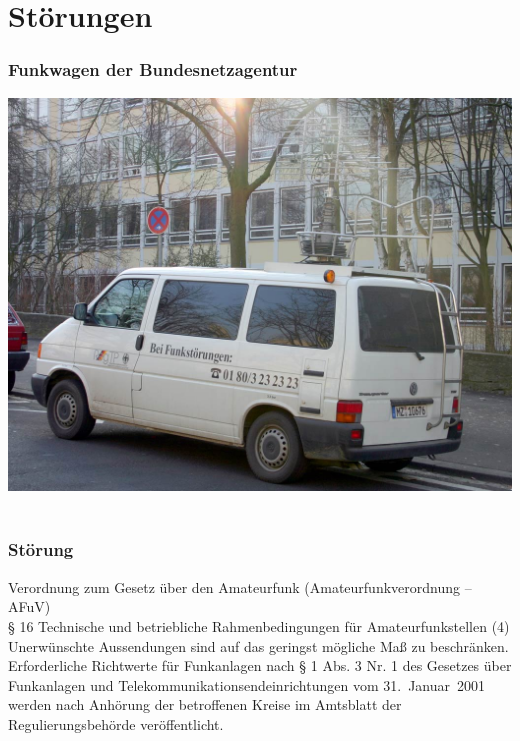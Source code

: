 

\subtitle{Technik A19: \\
  EMV und Sicherheit \\[2em]}
\date{Stand 12.07.2016}


\section*{Störungen}

\begin{frame}
  \frametitle{Funkwagen der Bundesnetzagentur}
  \begin{center}
    \includegraphics[width=1\textwidth,height=.85\textheight,keepaspectratio]{a19/FunkwagenBNetz.jpg}\\
    {\tiny \hyperlink{refs}{\cite{wm}} \\[1em]}
  \end{center}
\end{frame}

\begin{frame}
  \frametitle{Störung}
  \begin{center}
    \begin{block}{Verordnung zum Gesetz über den Amateurfunk (Amateurfunkverordnung -- AFuV) \\
      § 16 Technische und betriebliche Rahmenbedingungen für Amateurfunkstellen}
      (4) Unerwünschte Aussendungen sind auf das geringst mögliche Maß zu beschränken. Erforderliche Richtwerte für Funkanlagen nach § 1 Abs. 3 Nr. 1 des Gesetzes über Funkanlagen und Telekommunikationsendeinrichtungen vom 31.~Januar~2001 werden nach Anhörung der betroffenen Kreise im Amtsblatt der Regulierungsbehörde veröffentlicht.
    \end{block}
  \end{center}
\end{frame}

